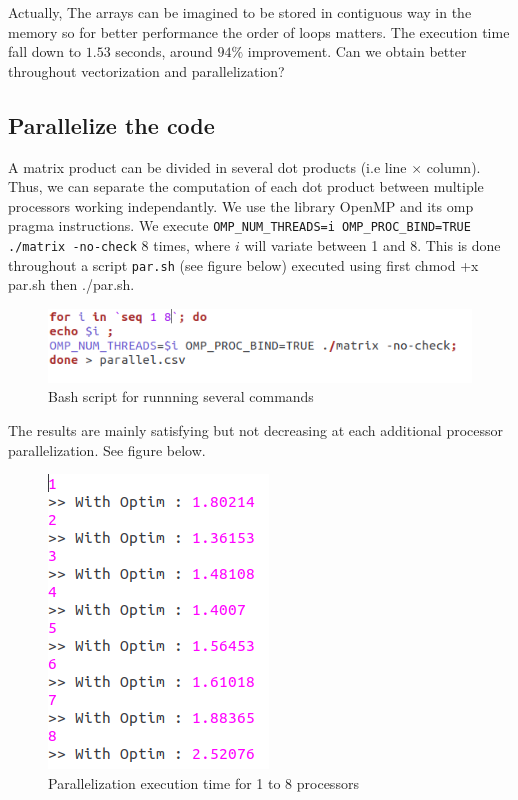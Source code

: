 \documentclass[a4paper, 10 pt, conference]{ieeeconf}
\begin{document}
Actually, The arrays can be imagined to be stored in contiguous way in the memory so for better performance the order of loops matters. The execution time fall down to $1.53$ seconds, around $94\%$ improvement. Can we obtain better throughout vectorization and parallelization?

\subsection{Parallelize the code}

A matrix product can be divided in several dot products (i.e line $\times$ column). Thus, we can separate the computation of each dot product between multiple processors working independantly. We use the library OpenMP \cite{3} and its omp pragma instructions. We execute \texttt{OMP\_NUM\_THREADS=i OMP\_PROC\_BIND=TRUE ./matrix -no-check} 8 times, where $i$ will variate between 1 and 8. This is done throughout a script \texttt{par.sh} (see figure below) executed using first chmod +x par.sh then ./par.sh. 

\begin{figure}[h!]
  \center \includegraphics[scale=0.4]{pics/script1.png}
  \caption{Bash script for runnning several commands}
  \label{}
\end{figure}


The results are mainly satisfying but not decreasing at each additional processor parallelization. See figure below.

\begin{figure}[h!]
  \center \includegraphics[scale=0.4]{pics/par.png}
  \caption{Parallelization execution time for 1 to 8 processors}
  \label{}
\end{figure}
\end{document}
